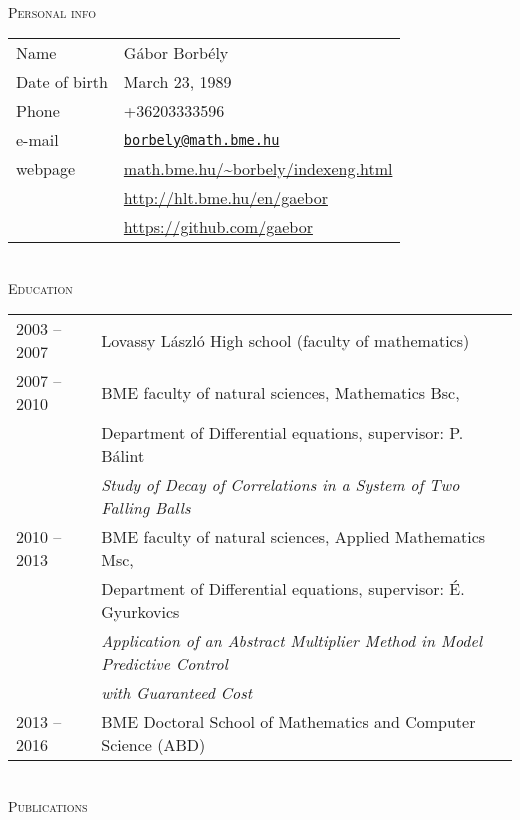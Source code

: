 \documentclass[12pt]{article}
\newcommand\mail[1]{\href{mailto:#1}{\texttt{#1}}}
\begin{document}
{ \ }
\\
\textsc{Personal info}
 \vspace{0.3cm}
 \\
       \begin{tabular}{p{3cm}l}
	       Name & Gábor Borbély\\
           Date of birth & March 23, 1989\\
		   Phone &  +36203333596\\
		   e-mail & \mail{borbely@math.bme.hu}\\
		   webpage& \url{math.bme.hu/~borbely/indexeng.html} \\
                  & \url{http://hlt.bme.hu/en/gaebor} \\
                  & \url{https://github.com/gaebor}
       \end{tabular}
 \vspace{0.3cm}
 \\
 \textsc{Education}
 \vspace{0.3cm}
 \\
       \begin{tabular}{p{3cm}l}
	       2003 -- 2007 & Lovassy László High school (faculty of mathematics) \\
           2007 -- 2010& BME faculty of natural sciences, Mathematics Bsc, \\
		              & Department of Differential equations, supervisor: P. Bálint\\
					  & \emph{Study of Decay of Correlations in a System of Two Falling Balls} \\
		   2010 -- 2013 & BME faculty of natural sciences, Applied Mathematics Msc,\\
						& Department of Differential equations, supervisor: É. Gyurkovics\\
						& \emph{Application of an Abstract Multiplier Method in Model Predictive Control}\\ & \emph{ with Guaranteed Cost} \\
		    2013 -- 2016 & BME Doctoral School of Mathematics and Computer Science (ABD)
       \end{tabular}
 \vspace{0.3cm}
 \\
 \textsc{Publications}
 \vspace{0.3cm}
 \\
\end{document}
